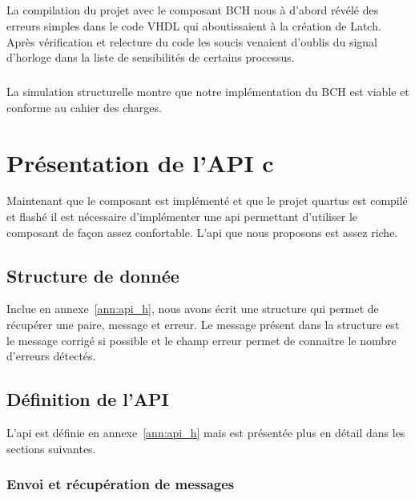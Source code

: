 \documentclass[a4paper, 11pt, svgnames]{report}
\begin{document}
        \paragraph{}
        La compilation du projet avec le composant BCH nous à d'abord révélé
        des erreurs simples dans le code VHDL qui aboutissaient à la création
        de Latch. Après vérification et relecture du code les soucis venaient
        d'oublis du signal d'horloge dans la liste de sensibilités de certains
        processus.

        \paragraph{}
        La simulation structurelle montre que notre implémentation
        du BCH est viable et conforme au cahier des charges.

    \chapter{Présentation de l'API c}

    Maintenant que le composant est implémenté et que le projet quartus est
    compilé et flashé il est nécessaire d'implémenter une api permettant
    d'utiliser le composant de façon assez confortable. L'api que nous
    proposons est assez riche.

    \section{Structure de donnée}

    Inclue en annexe~\ref{ann:api_h}, nous avons écrit une structure qui permet
    de récupérer une paire, message et erreur. Le message présent dans la
    structure est le message corrigé si possible et le champ erreur permet de
    connaitre le nombre d'erreurs détectés.

    \section{Définition de l'API}

    L'api est définie en annexe~\ref{ann:api_h} mais est présentée plus en
    détail dans les sections suivantes.

    \subsection{Envoi et récupération de messages}
\end{document}
